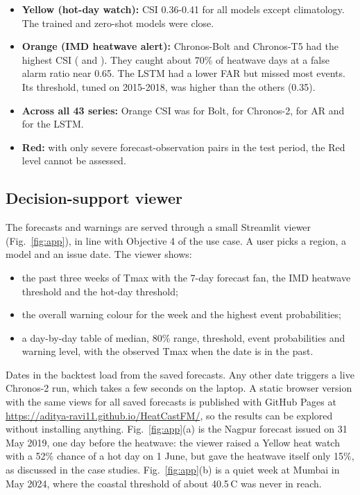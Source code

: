 \begin{itemize}
\item \textbf{Yellow (hot-day watch):} CSI 0.36-0.41 for all models except climatology. The trained and zero-shot models were close.
\item \textbf{Orange (IMD heatwave alert):} Chronos-Bolt and Chronos-T5 had the highest CSI (\CSIorangeChronosBolt{} and \CSIorangeChronosTfive). They caught about 70\% of heatwave days at a false alarm ratio near 0.65. The LSTM had a lower FAR but missed most events. Its threshold, tuned on 2015-2018, was higher than the others (0.35).
\item \textbf{Across all 43 series:} Orange CSI was \AllCSIorangeChronosBolt{} for Bolt, \AllCSIorangeChronostwo{} for Chronos-2, \AllCSIorangeARanomaly{} for AR and \AllCSIorangeQuantileLSTM{} for the LSTM.
\item \textbf{Red:} with only \NSevPairs{} severe forecast-observation pairs in the test period, the Red level cannot be assessed.
\end{itemize}



\subsection{Decision-support viewer}
The forecasts and warnings are served through a small Streamlit viewer (Fig.~\ref{fig:app}), in line with Objective 4 of the use case. A user picks a region, a model and an issue date. The viewer shows:
\begin{itemize}
\item the past three weeks of Tmax with the 7-day forecast fan, the IMD heatwave threshold and the hot-day threshold;
\item the overall warning colour for the week and the highest event probabilities;
\item a day-by-day table of median, 80\% range, threshold, event probabilities and warning level, with the observed Tmax when the date is in the past.
\end{itemize}
Dates in the backtest load from the saved forecasts. Any other date triggers a live Chronos-2 run, which takes a few seconds on the laptop. A static browser version with the same views for all saved forecasts is published with GitHub Pages at \url{https://aditya-ravi11.github.io/HeatCastFM/}, so the results can be explored without installing anything. Fig.~\ref{fig:app}(a) is the Nagpur forecast issued on 31 May 2019, one day before the heatwave: the viewer raised a Yellow heat watch with a 52\% chance of a hot day on 1 June, but gave the heatwave itself only 15\%, as discussed in the case studies. Fig.~\ref{fig:app}(b) is a quiet week at Mumbai in May 2024, where the coastal threshold of about 40.5\,\textdegree C was never in reach.

